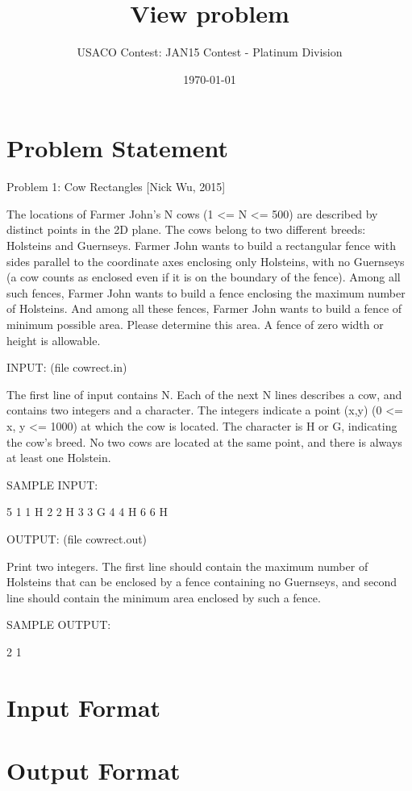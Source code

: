 \documentclass[12pt]{article}
\title{View problem}
\author{USACO Contest: JAN15 Contest - Platinum Division}
\date{\today}
\begin{document}
\maketitle

\section*{Problem Statement}

Problem 1: Cow Rectangles [Nick Wu, 2015]

The locations of Farmer John's N cows (1 <= N <= 500) are described by
distinct points in the 2D plane.  The cows belong to two different
breeds: Holsteins and Guernseys.  Farmer John wants to build a
rectangular fence with sides parallel to the coordinate axes enclosing
only Holsteins, with no Guernseys (a cow counts as enclosed even if it
is on the boundary of the fence).  Among all such fences, Farmer John
wants to build a fence enclosing the maximum number of Holsteins.  And
among all these fences, Farmer John wants to build a fence of minimum
possible area.  Please determine this area.  A fence of zero width or
height is allowable.

INPUT: (file cowrect.in)

The first line of input contains N.  Each of the next N lines
describes a cow, and contains two integers and a character. The
integers indicate a point (x,y) (0 <= x, y <= 1000) at which the cow
is located. The character is H or G, indicating the cow's breed.  No
two cows are located at the same point, and there is always at least
one Holstein.

SAMPLE INPUT:

5
1 1 H
2 2 H
3 3 G
4 4 H
6 6 H

OUTPUT: (file cowrect.out)

Print two integers. The first line should contain the maximum number
of Holsteins that can be enclosed by a fence containing no Guernseys,
and second line should contain the minimum area enclosed by such a
fence.

SAMPLE OUTPUT:

2
1



\section*{Input Format}


\section*{Output Format}
\end{document}
